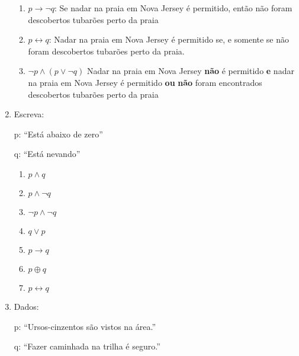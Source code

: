 \documentclass[12pt]{article}
\let\biconditional\leftrightarrow
\begin{document}
\begin{enumerate}
\begin{enumerate}
            \item \( p \to \neg q \): Se nadar na praia em Nova Jersey é permitido, então não foram descobertos tubarões perto da praia

            \item \( p \biconditional q \): Nadar na praia em Nova Jersey é permitido se, e somente se não foram descobertos tubarões perto da praia.

            \item \( \neg p \land (p \lor \neg q) \) Nadar na praia em Nova Jersey \textbf{não} é permitido \textbf{e} nadar na praia em Nova Jersey é permitido \textbf{ou} \textbf{não} foram encontrados descobertos tubarões perto da praia
        \end{enumerate}

    \item Escreva:
        \begin{center}
            p: “Está abaixo de zero”

            q: “Está nevando”
        \end{center}
        \begin{enumerate}
            \item \( p \land q \)
            \item \( p \land \neg q \) 
            \item \( \neg p \land \neg q \) 
            \item \( q \lor p \) 
            \item \( p \to q \) 
            \item \( p \oplus q \) 
            \item \( p \biconditional q \) 
        \end{enumerate}

    \item Dados:
        \begin{center}
            p: “Ursos-cinzentos são vistos na área.”

            q: “Fazer caminhada na trilha é seguro.”


\end{center}
\end{enumerate}
\end{document}
